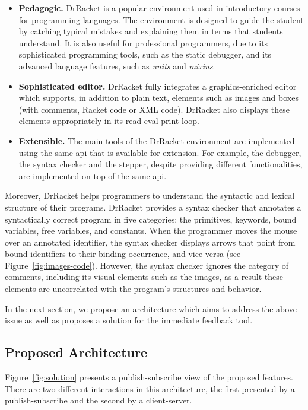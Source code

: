 \begin{itemize}
	\item \textbf{Pedagogic.} DrRacket is a popular environment used in introductory courses for programming languages. The environment is designed to guide the student by catching typical mistakes and explaining them in terms that students understand. It is also useful for professional programmers, due to its sophisticated programming tools, such as the static debugger, and its advanced language features, such as \textit{units} and \textit{mixins}.

	\item \textbf{Sophisticated editor.} DrRacket fully integrates a graphics-enriched editor which supports, in addition to plain text, elements such as images and boxes (with comments, Racket code or XML code). DrRacket also displays these elements appropriately in its read-eval-print loop.

	\item \textbf{Extensible.} The main tools of the DrRacket environment are implemented using the same \gls{api} that is available for extension. For example, the debugger, the syntax checker and the stepper, despite providing different functionalities, are implemented on top of the same \gls{api}.
\end{itemize}

Moreover, DrRacket helps programmers to understand the syntactic and lexical structure of their programs. DrRacket provides a syntax checker that annotates a syntactically correct program in five categories: the primitives, keywords, bound variables, free variables, and constants. When the programmer moves the mouse over an annotated identifier, the syntax checker displays arrows that point from bound identifiers to their binding occurrence, and vice-versa (see Figure~\ref{fig:images-code}). However, the syntax checker ignores the category of comments, including its visual elements such as the images, as a result these elements are uncorrelated with the program's structures and behavior.

In the next section, we propose an architecture which aims to address the above issue as well as proposes a solution for the immediate feedback tool.

\subsection{Proposed Architecture}

Figure~\ref{fig:solution} presents a publish-subscribe view of the proposed features. There are two different interactions in this architecture, the first presented by a publish-subscribe and the second by a client-server.

